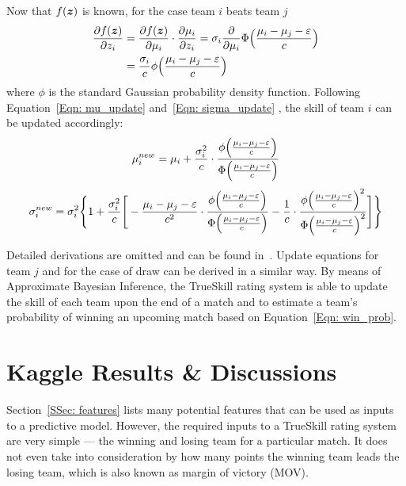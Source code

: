 Now that $f(\bm{z})$ is known, for the case team $i$ beats team $j$
\begin{equation}
\begin{split}
\frac{\partial f(\bm{z})}{\partial z_{i}} &= \frac{\partial f(\bm{z})}{\partial \mu_{i}} \cdot \frac{\partial \mu_{i}}{\partial z_{i}} = \sigma_{i}\frac{\partial}{\partial \mu_{i}}\Phi \Big{(} \frac{\mu_{i} - \mu_{j} - \varepsilon}{c}  \Big{)} \\
&= \frac{\sigma_{i}}{c} \phi \Big{(} \frac{\mu_{i} - \mu_{j} - \varepsilon}{c}  \Big{)}
\end{split}
\end{equation}
where $\phi$ is the standard Gaussian probability density function. Following Equation~\ref{Eqn: mu_update} and~\ref{Eqn: sigma_update} , the skill of team $i$ can be updated accordingly:
\begin{equation}
\mu_{i}^{new} = \mu_{i} + \frac{\sigma_{i}^{2}}{c} \cdot \frac{\phi \Big{(} \frac{\mu_{i} - \mu_{j} - \varepsilon}{c}  \Big{)}}{\Phi \Big{(} \frac{\mu_{i} - \mu_{j} - \varepsilon}{c}  \Big{)}}
\end{equation}
\begin{equation}
\sigma_{i}^{new} = \sigma_{i}^{2} 
\Bigg{\{} 
1 + \frac{\sigma_{i}^{2}}{c} 
\Bigg{[} 
-\frac{\mu_{i} - \mu_{j} - \varepsilon}{c^{2}} \cdot \frac{\phi \Big{(} \frac{\mu_{i} - \mu_{j} - \varepsilon}{c}  \Big{)}}{\Phi \Big{(} \frac{\mu_{i} - \mu_{j} - \varepsilon}{c}  \Big{)}}
-\frac{1}{c} \cdot  \frac{\phi \Big{(} \frac{\mu_{i} - \mu_{j} - \varepsilon}{c}  \Big{)}^{2}}{\Phi \Big{(} \frac{\mu_{i} - \mu_{j} - \varepsilon}{c}
 \Big{)}^{2}}
\Bigg{]}
\Bigg{\}}
\end{equation}

Detailed derivations are omitted and can be found in~\cite{RC11}. Update equations for team $j$ and for the case of draw can be derived in a similar way. By means of Approximate Bayesian Inference, the TrueSkill rating system is able to update the skill of each team upon the end of a match and to estimate a team's probability of winning an upcoming match based on Equation~\ref{Eqn: win_prob}.

\section{Kaggle Results \& Discussions}\label{Sec: imp}

Section~\ref{SSec: features} lists many potential features that can be used as inputs to a predictive model. However, the required inputs to a TrueSkill rating system are very simple --- the winning and losing team for a particular match. It does not even take into consideration by how many points the winning team leads the losing team, which is also known as margin of victory (MOV). 

